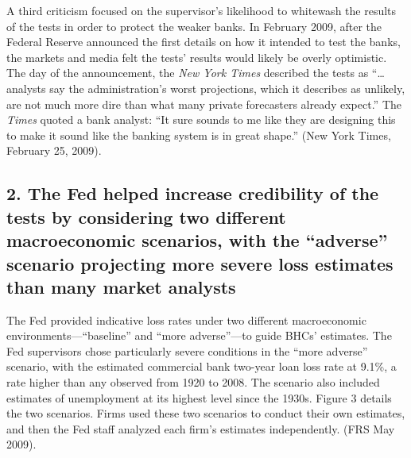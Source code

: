 \documentclass[justified, nobib]{tufte-handout2}
\begin{document}
A third criticism focused on the supervisor's likelihood to whitewash
the results of the tests in order to protect the weaker banks. In
February 2009, after the Federal Reserve announced the first details on
how it intended to test the banks, the markets and media felt the tests'
results would likely be overly optimistic. The day of the announcement,
the \emph{New York Times} described the tests as ``\ldots{}analysts say
the administration's worst projections, which it describes as unlikely,
are not much more dire than what many private forecasters already
expect.'' The \emph{Times} quoted a bank analyst: ``It sure sounds to me
like they are designing this to make it sound like the banking system is
in great shape.'' (New York Times, February 25, 2009).

\subsection{2. The Fed helped increase credibility of the tests by
considering two different macroeconomic scenarios, with the ``adverse''
scenario projecting more severe loss estimates than many market
analysts}

The Fed provided indicative loss rates under two different macroeconomic
environments---``baseline'' and ``more adverse''---to guide BHCs'
estimates. The Fed supervisors chose particularly severe conditions in
the ``more adverse'' scenario, with the estimated commercial bank
two-year loan loss rate at 9.1\%, a rate higher than any observed from
1920 to 2008. The scenario also included estimates of unemployment at
its highest level since the 1930s. Figure 3 details the two scenarios.
Firms used these two scenarios to conduct their own estimates, and then
the Fed staff analyzed each firm's estimates independently. (FRS May
2009).
\end{document}
